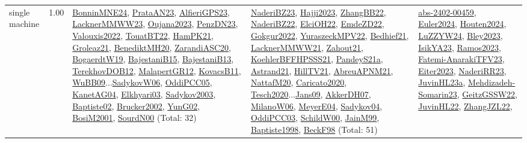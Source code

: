 {\begin{longtable}{p{3cm}r>{\raggedright\arraybackslash}p{6cm}>{\raggedright\arraybackslash}p{6cm}>{\raggedright\arraybackslash}p{8cm}}
\index{single machine}\index{Classification!single machine}single machine &  1.00 & \hyperref[detail:BonninMNE24]{BonninMNE24}, \hyperref[detail:PrataAN23]{PrataAN23}, \hyperref[detail:AlfieriGPS23]{AlfieriGPS23}, \hyperref[detail:LacknerMMWW23]{LacknerMMWW23}, \hyperref[detail:Oujana2023]{Oujana2023}, \hyperref[detail:PenzDN23]{PenzDN23}, \hyperref[detail:Valouxis2022]{Valouxis2022}, \hyperref[detail:TouatBT22]{TouatBT22}, \hyperref[detail:HamPK21]{HamPK21}, \hyperref[detail:Groleaz21]{Groleaz21}, \hyperref[detail:BenediktMH20]{BenediktMH20}, \hyperref[detail:ZarandiASC20]{ZarandiASC20}, \hyperref[detail:BogaerdtW19]{BogaerdtW19}, \hyperref[detail:BajestaniB15]{BajestaniB15}, \hyperref[detail:BajestaniB13]{BajestaniB13}, \hyperref[detail:TerekhovDOB12]{TerekhovDOB12}, \hyperref[detail:MalapertGR12]{MalapertGR12}, \hyperref[detail:KovacsB11]{KovacsB11}, \hyperref[detail:WuBB09]{WuBB09}...\hyperref[detail:SadykovW06]{SadykovW06}, \hyperref[detail:OddiPCC05]{OddiPCC05}, \hyperref[detail:KanetAG04]{KanetAG04}, \hyperref[detail:Elkhyari03]{Elkhyari03}, \hyperref[detail:Sadykov2003]{Sadykov2003}, \hyperref[detail:Baptiste02]{Baptiste02}, \hyperref[detail:Brucker2002]{Brucker2002}, \hyperref[detail:YunG02]{YunG02}, \hyperref[detail:BosiM2001]{BosiM2001}, \hyperref[detail:SourdN00]{SourdN00} (Total: 32) & \hyperref[detail:NaderiBZ23]{NaderiBZ23}, \hyperref[detail:Hajji2023]{Hajji2023}, \hyperref[detail:ZhangBB22]{ZhangBB22}, \hyperref[detail:NaderiBZ22]{NaderiBZ22}, \hyperref[detail:ElciOH22]{ElciOH22}, \hyperref[detail:EmdeZD22]{EmdeZD22}, \hyperref[detail:Gokgur2022]{Gokgur2022}, \hyperref[detail:YuraszeckMPV22]{YuraszeckMPV22}, \hyperref[detail:Bedhief21]{Bedhief21}, \hyperref[detail:LacknerMMWW21]{LacknerMMWW21}, \hyperref[detail:Zahout21]{Zahout21}, \hyperref[detail:KoehlerBFFHPSSS21]{KoehlerBFFHPSSS21}, \hyperref[detail:PandeyS21a]{PandeyS21a}, \hyperref[detail:Astrand21]{Astrand21}, \hyperref[detail:HillTV21]{HillTV21}, \hyperref[detail:AbreuAPNM21]{AbreuAPNM21}, \hyperref[detail:NattafM20]{NattafM20}, \hyperref[detail:Caricato2020]{Caricato2020}, \hyperref[detail:Tesch2020]{Tesch2020}...\hyperref[detail:Jans09]{Jans09}, \hyperref[detail:AkkerDH07]{AkkerDH07}, \hyperref[detail:MilanoW06]{MilanoW06}, \hyperref[detail:MeyerE04]{MeyerE04}, \hyperref[detail:Sadykov04]{Sadykov04}, \hyperref[detail:OddiPCC03]{OddiPCC03}, \hyperref[detail:SchildW00]{SchildW00}, \hyperref[detail:JainM99]{JainM99}, \hyperref[detail:Baptiste1998]{Baptiste1998}, \hyperref[detail:BeckF98]{BeckF98} (Total: 51) & \hyperref[detail:abs-2402-00459]{abs-2402-00459}, \hyperref[detail:Euler2024]{Euler2024}, \hyperref[detail:Houten2024]{Houten2024}, \hyperref[detail:LuZZYW24]{LuZZYW24}, \hyperref[detail:Bley2023]{Bley2023}, \hyperref[detail:IsikYA23]{IsikYA23}, \hyperref[detail:Ramos2023]{Ramos2023}, \hyperref[detail:Fatemi-AnarakiTFV23]{Fatemi-AnarakiTFV23}, \hyperref[detail:Eiter2023]{Eiter2023}, \hyperref[detail:NaderiRR23]{NaderiRR23}, \hyperref[detail:JuvinHL23a]{JuvinHL23a}, \hyperref[detail:Mehdizadeh-Somarin23]{Mehdizadeh-Somarin23}, \hyperref[detail:GeitzGSSW22]{GeitzGSSW22}, \hyperref[detail:JuvinHL22]{JuvinHL22}, \hyperref[detail:ZhangJZL22]{ZhangJZL22}, 
\end{longtable}}
